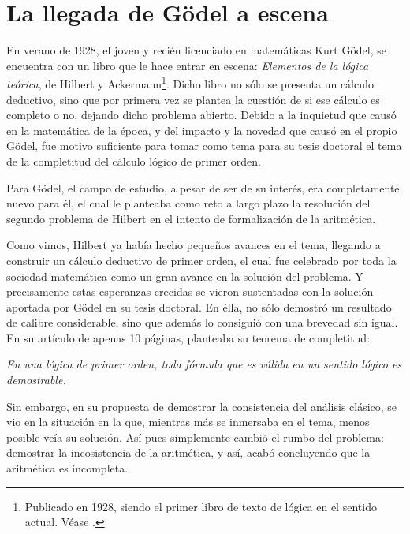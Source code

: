 \section{La llegada de Gödel a escena} 

En verano de 1928, el joven y recién licenciado en matemáticas Kurt Gödel, se encuentra con un libro que le hace entrar en escena: \textit{Elementos de la lógica teórica}, de 
Hilbert y Ackermann\footnote{Publicado en 1928, siendo el primer libro de texto de lógica en el sentido actual. Véase \cite{hilbert1962elementos}.}. Dicho libro no sólo se presenta un cálculo deductivo, 
sino que por primera vez se plantea la cuestión de si ese cálculo es completo o no, dejando dicho problema abierto. Debido a la inquietud que causó en la matemática de la época,
y del impacto y la novedad que causó en el propio Gödel, fue motivo suficiente para tomar como tema para su tesis doctoral el tema de la completitud del cálculo lógico de primer orden.

Para Gödel, el campo de estudio, a pesar de ser de su interés, era completamente nuevo para él, el cual le planteaba como reto a largo plazo la resolución del segundo problema
de Hilbert en el intento de formalización de la aritmética. 

Como vimos, Hilbert ya había hecho pequeños avances en el tema, llegando a construir un cálculo deductivo de primer orden, el cual fue celebrado por toda la sociedad matemática 
como un gran avance en la solución del problema. Y precisamente estas esperanzas crecidas se vieron sustentadas con la solución aportada por Gödel en su tesis doctoral. En élla, 
no sólo demostró un resultado de calibre considerable, sino que además lo consiguió con una brevedad sin igual. En su artículo de apenas 10 páginas, planteaba su teorema de completitud:

\begin{center}
    \textit{En una lógica de primer orden, toda fórmula que es válida en un sentido lógico es demostrable.}
\end{center}


Sin embargo, en su propuesta de demostrar la consistencia del análisis clásico, se vio en la situación en la que, mientras más se inmersaba en el tema, menos posible veía su solución. Así pues simplemente
cambió el rumbo del problema: demostrar la incosistencia de la aritmética, y así, acabó concluyendo que la aritmética es incompleta.






\endinput
